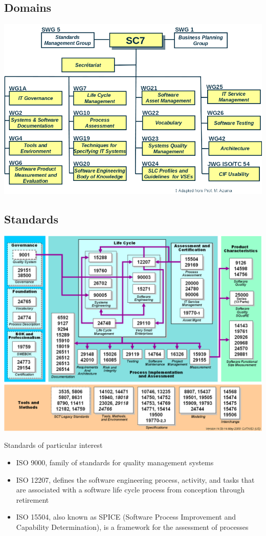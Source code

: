 \documentclass{article}[18pt]
\begin{document}
\subsection{Domains}
\begin{center}
	\includegraphics[scale=0.7]{Domains}
\end{center}
\subsection{Standards}
\begin{center}
	\includegraphics[scale=0.7]{Standards}
\end{center}
Standards of particular interest
\begin{itemize}
	\item ISO 9000, family of standards for quality management systems
	\item ISO 12207, defines the software engineering process, activity, and tasks that are associated with a software life cycle process from conception through retirement
	\item ISO 15504, also known as SPICE (Software Process Improvement and Capability Determination), is a framework for the assessment of processes
\end{itemize}
\end{document}
